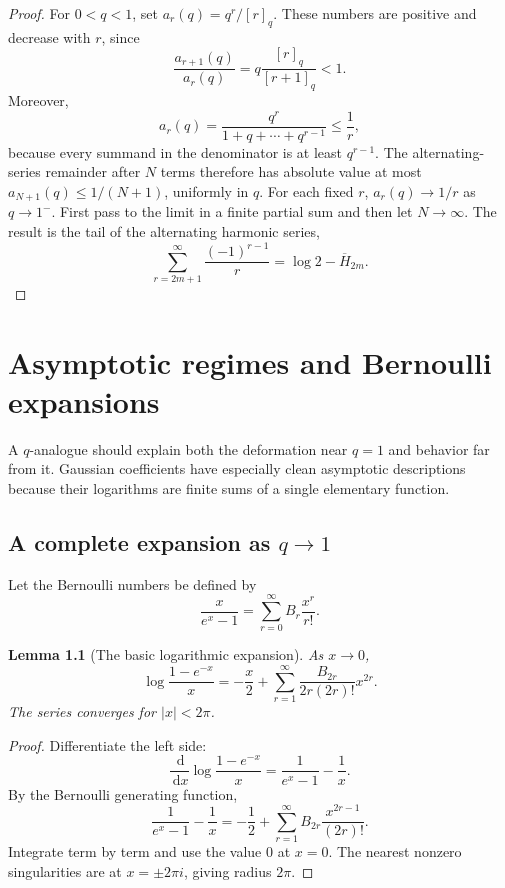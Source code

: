 \documentclass[11pt,oneside,openany]{book}
\newtheorem{lemma}[theorem]{Lemma}
\theoremstyle{definition}
\theoremstyle{remark}
\newcommand{\dd}{\,\mathrm d}
\newcommand{\abs}[1]{\lvert #1\rvert}
\begin{document}
\begin{proof}
For $0<q<1$, set $a_r(q)=q^r/[r]_q$.  These numbers are positive and decrease with $r$, since
\[
 \frac{a_{r+1}(q)}{a_r(q)}=q\frac{[r]_q}{[r+1]_q}<1.
\]
Moreover,
\[
 a_r(q)=\frac{q^r}{1+q+\cdots+q^{r-1}}
 \le\frac1r,
\]
because every summand in the denominator is at least $q^{r-1}$.  The alternating-series remainder after $N$ terms therefore has absolute value at most $a_{N+1}(q)\le1/(N+1)$, uniformly in $q$.  For each fixed $r$, $a_r(q)\to1/r$ as $q\to1^-$.  First pass to the limit in a finite partial sum and then let $N\to\infty$.  The result is the tail of the alternating harmonic series,
\[
 \sum_{r=2m+1}^{\infty}\frac{(-1)^{r-1}}r
 =\log2-\overline H_{2m}.
\]
\end{proof}

\chapter{Asymptotic regimes and Bernoulli expansions}\label{chap:asymptotics}

A $q$-analogue should explain both the deformation near $q=1$ and behavior far from it.  Gaussian coefficients have especially clean asymptotic descriptions because their logarithms are finite sums of a single elementary function.

\section{A complete expansion as \texorpdfstring{$q\to1$}{q to 1}}

Let the Bernoulli numbers be defined by
\[
 \frac{x}{e^x-1}=\sum_{r=0}^{\infty}B_r\frac{x^r}{r!}.
\]

\begin{lemma}[The basic logarithmic expansion]\label{lem:basic-bernoulli-log}
As $x\to0$,
\[
 \log\frac{1-e^{-x}}x
 =-\frac x2+
 \sum_{r=1}^{\infty}
 \frac{B_{2r}}{2r(2r)!}x^{2r}.
 \tag{19.1}\label{eq:basic-bernoulli-log}
\]
The series converges for $\abs x<2\pi$.
\end{lemma}

\begin{proof}
Differentiate the left side:
\[
 \frac{\dd}{\dd x}\log\frac{1-e^{-x}}x
 =\frac1{e^x-1}-\frac1x.
\]
By the Bernoulli generating function,
\[
 \frac1{e^x-1}-\frac1x
 =-\frac12+\sum_{r=1}^{\infty}
 B_{2r}\frac{x^{2r-1}}{(2r)!}.
\]
Integrate term by term and use the value $0$ at $x=0$.  The nearest nonzero singularities are at $x=\pm2\pi i$, giving radius $2\pi$.
\end{proof}
\end{document}
